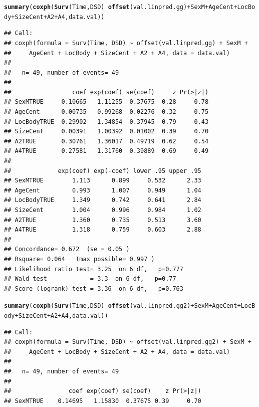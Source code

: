 \documentclass{article}\usepackage[]{graphicx}\usepackage[]{color}
\makeatletter
\newcommand{\hlopt}[1]{\textcolor[rgb]{0,0,0}{#1}}%
\newcommand{\hlstd}[1]{\textcolor[rgb]{0.345,0.345,0.345}{#1}}%
\newcommand{\hlkwd}[1]{\textcolor[rgb]{0.737,0.353,0.396}{\textbf{#1}}}%
\newenvironment{kframe}{%
 \def\at@end@of@kframe{}%
 \ifinner\ifhmode%
  \def\at@end@of@kframe{\end{minipage}}%
  \begin{minipage}{\columnwidth}%
 \fi\fi%
 \def\FrameCommand##1{\hskip\@totalleftmargin \hskip-\fboxsep
 \colorbox{shadecolor}{##1}\hskip-\fboxsep
     \hskip-\linewidth \hskip-\@totalleftmargin \hskip\columnwidth}%
 \MakeFramed {\advance\hsize-\width
   \@totalleftmargin\z@ \linewidth\hsize
   \@setminipage}}%
 {\par\unskip\endMakeFramed%
 \at@end@of@kframe}
\newenvironment{knitrout}{}{} %
\makeatother
\begin{document}
\begin{knitrout}
\begin{kframe}
{\ttfamily\noindent\bfseries\color{errorcolor}{\#\# Error in fitter(X, Y, strats, offset, init, control, weights = weights, : NA/NaN/Inf in foreign function call (arg 6)}}\begin{alltt}
\hlkwd{summary}\hlstd{(}\hlkwd{coxph}\hlstd{(}\hlkwd{Surv}\hlstd{(Time, DSD)} \hlopt{~} \hlkwd{offset}\hlstd{(val.linpred.gg)} \hlopt{+} \hlstd{SexM} \hlopt{+} \hlstd{AgeCent} \hlopt{+} \hlstd{LocBody} \hlopt{+} \hlstd{SizeCent} \hlopt{+} \hlstd{A2} \hlopt{+} \hlstd{A4, data.val))}
\end{alltt}
\begin{verbatim}
## Call:
## coxph(formula = Surv(Time, DSD) ~ offset(val.linpred.gg) + SexM + 
##     AgeCent + LocBody + SizeCent + A2 + A4, data = data.val)
## 
##   n= 49, number of events= 49 
## 
##                 coef exp(coef) se(coef)     z Pr(>|z|)
## SexMTRUE     0.10665   1.11255  0.37675  0.28     0.78
## AgeCent     -0.00735   0.99268  0.02276 -0.32     0.75
## LocBodyTRUE  0.29902   1.34854  0.37945  0.79     0.43
## SizeCent     0.00391   1.00392  0.01002  0.39     0.70
## A2TRUE       0.30761   1.36017  0.49719  0.62     0.54
## A4TRUE       0.27581   1.31760  0.39889  0.69     0.49
## 
##             exp(coef) exp(-coef) lower .95 upper .95
## SexMTRUE        1.113      0.899     0.532      2.33
## AgeCent         0.993      1.007     0.949      1.04
## LocBodyTRUE     1.349      0.742     0.641      2.84
## SizeCent        1.004      0.996     0.984      1.02
## A2TRUE          1.360      0.735     0.513      3.60
## A4TRUE          1.318      0.759     0.603      2.88
## 
## Concordance= 0.672  (se = 0.05 )
## Rsquare= 0.064   (max possible= 0.997 )
## Likelihood ratio test= 3.25  on 6 df,   p=0.777
## Wald test            = 3.3  on 6 df,   p=0.77
## Score (logrank) test = 3.36  on 6 df,   p=0.763
\end{verbatim}
\begin{alltt}
\hlkwd{summary}\hlstd{(}\hlkwd{coxph}\hlstd{(}\hlkwd{Surv}\hlstd{(Time, DSD)} \hlopt{~} \hlkwd{offset}\hlstd{(val.linpred.gg2)} \hlopt{+} \hlstd{SexM} \hlopt{+} \hlstd{AgeCent} \hlopt{+} \hlstd{LocBody} \hlopt{+} \hlstd{SizeCent} \hlopt{+} \hlstd{A2} \hlopt{+} \hlstd{A4, data.val))}
\end{alltt}
\begin{verbatim}
## Call:
## coxph(formula = Surv(Time, DSD) ~ offset(val.linpred.gg2) + SexM + 
##     AgeCent + LocBody + SizeCent + A2 + A4, data = data.val)
## 
##   n= 49, number of events= 49 
## 
##                coef exp(coef) se(coef)    z Pr(>|z|)
## SexMTRUE    0.14695   1.15830  0.37675 0.39     0.70

\end{verbatim}
\end{kframe}
\end{knitrout}
\end{document}
